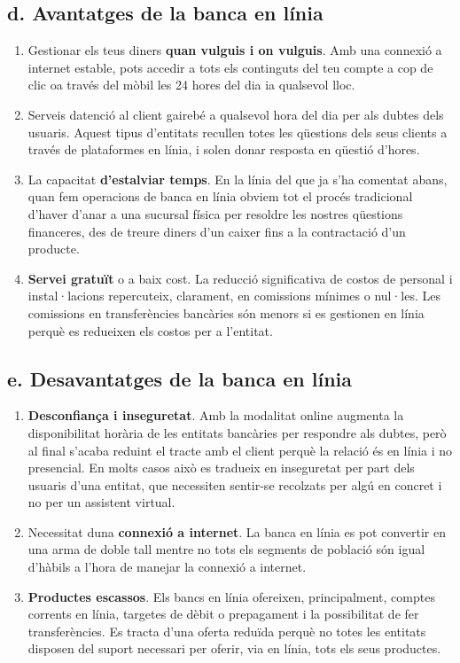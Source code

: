 \subsection*{d. Avantatges de la banca en línia}


\begin{enumerate}
    \item Gestionar els teus diners \textbf{quan vulguis i on vulguis}. Amb una connexió a internet estable, pots accedir a tots els continguts del teu compte a cop de clic oa través del mòbil les 24 hores del dia ia qualsevol lloc.
    \item Serveis datenció al client gairebé a qualsevol hora del dia per als dubtes dels usuaris. Aquest tipus d'entitats recullen totes les qüestions dels seus clients a través de plataformes en línia, i solen donar resposta en qüestió d'hores.
    \item La capacitat \textbf{d'estalviar temps}. En la línia del que ja s'ha comentat abans, quan fem operacions de banca en línia obviem tot el procés tradicional d'haver d'anar a una sucursal física per resoldre les nostres qüestions financeres, des de treure diners d'un caixer fins a la contractació d'un producte.
    \item \textbf{Servei gratuït} o a baix cost. La reducció significativa de costos de personal i instal·lacions repercuteix, clarament, en comissions mínimes o nul·les. Les comissions en transferències bancàries són menors si es gestionen en línia perquè es redueixen els costos per a l'entitat.
\end{enumerate}




\subsection*{e. Desavantatges de la banca en línia}

\begin{enumerate}
    \item \textbf{Desconfiança i inseguretat}. Amb la modalitat online augmenta la disponibilitat horària de les entitats bancàries per respondre als dubtes, però al final s'acaba reduint el tracte amb el client perquè la relació és en línia i no presencial. En molts casos això es tradueix en inseguretat per part dels usuaris d'una entitat, que necessiten sentir-se recolzats per algú en concret i no per un assistent virtual.
    \item Necessitat duna \textbf{connexió a internet}. La banca en línia es pot convertir en una arma de doble tall mentre no tots els segments de població són igual d'hàbils a l'hora de manejar la connexió a internet.
    \item \textbf{Productes escassos}. Els bancs en línia ofereixen, principalment, comptes corrents en línia, targetes de dèbit o prepagament i la possibilitat de fer transferències. Es tracta d'una oferta reduïda perquè no totes les entitats disposen del suport necessari per oferir, via en línia, tots els seus productes.
\end{enumerate}


